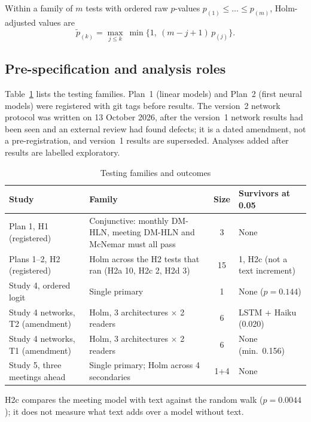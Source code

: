 \documentclass[11pt]{article}
\begin{document}
Within a family of $m$ tests with ordered raw $p$-values $p_{(1)}\le\dots\le p_{(m)}$, Holm-adjusted values are
\begin{equation}
  \tilde p_{(k)} = \max_{j\le k}\ \min\{1,\ (m-j+1)\,p_{(j)}\}.
\end{equation}

\subsection{Pre-specification and analysis roles}\label{sec:prereg}

Table~\ref{tab:holm} lists the testing families. Plan~1 (linear models) and Plan~2 (first neural models) were
registered with git tags before results. The version~2 network protocol was written on 13 October 2026, after
the version~1 network results had been seen and an external review had found defects; it is a dated amendment,
not a pre-registration, and version~1 results are superseded. Analyses added after results are labelled
exploratory.

\begin{table}[ht]\centering\small
\begin{threeparttable}
\caption{Testing families and outcomes}\label{tab:holm}
\begin{tabular}{p{4.0cm}p{6.2cm}cp{3.4cm}}
\toprule
Study & Family & Size & Survivors at 0.05 \\ \midrule
Plan 1, H1 (registered) & Conjunctive: monthly DM-HLN, meeting DM-HLN and McNemar must all pass & 3 & None \\
Plans 1--2, H2 (registered) & Holm across the H2 tests that ran (H2a 10, H2c 2, H2d 3) & 15 & 1, H2c (not a text increment)\tnote{a} \\
Study 4, ordered logit & Single primary & 1 & None ($p=0.144$) \\
Study 4 networks, T2 (amendment) & Holm, 3 architectures $\times$ 2 readers & 6 & LSTM + Haiku (0.020) \\
Study 4 networks, T1 (amendment) & Holm, 3 architectures $\times$ 2 readers & 6 & None (min.\ 0.156) \\
Study 5, three meetings ahead & Single primary; Holm across 4 secondaries & 1+4 & None \\
\bottomrule
\end{tabular}
\begin{tablenotes}\footnotesize
\item[a] H2c compares the meeting model with text against the random walk ($p=0.0044$); it does not measure what
text adds over a model without text.
\end{tablenotes}
\end{threeparttable}
\end{table}
\end{document}
